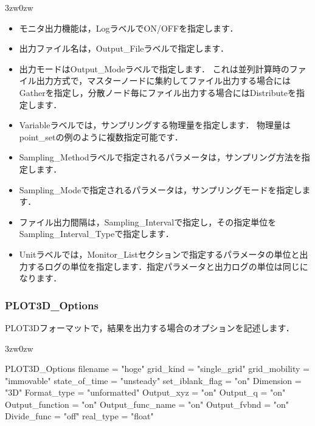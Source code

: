 \begin{indentation}{3zw}{0zw}
\begin{itemize}
\item モニタ出力機能は，LogラベルでON/OFFを指定します．
\item 出力ファイル名は，Output\_Fileラベルで指定します．
\item 出力モードはOutput\_Modeラベルで指定します．
これは並列計算時のファイル出力方式で，マスターノードに集約してファイル出力する場合にはGatherを指定し，分散ノード毎にファイル出力する場合にはDistributeを指定します．
\item Variableラベルでは，サンプリングする物理量を指定します．
物理量はpoint\_setの例のように複数指定可能です．
\item Sampling\_Methodラベルで指定されるパラメータは，サンプリング方法を指定します．
\item Sampling\_Modeで指定されるパラメータは，サンプリングモードを指定します．
\item ファイル出力間隔は，Sampling\_Intervalで指定し，その指定単位をSampling\_Interval\_Typeで指定します．
\item Unitラベルでは，Monitor\_Listセクションで指定するパラメータの単位と出力するログの単位を指定します．指定パラメータと出力ログの単位は同じになります．
\end{itemize}

\end{indentation}


\pagebreak
\subsubsection{PLOT3D\_Options}

PLOT3Dフォーマットで，結果を出力する場合のオプションを記述します．

\begin{indentation}{3zw}{0zw}
\small

\begin{program}
  PLOT3D_Options {
    filename         = "hoge"
    grid_kind        = "single_grid"
    grid_mobility    = "immovable"
    state_of_time    = "unsteady"
    set_iblank_flag  = "on"
    Dimension        = "3D"
    Format_type      = "unformatted"
    Output_xyz       = "on"
    Output_q         = "on"
    Output_function  = "on"
    Output_func_name = "on"
    Output_fvbnd     = "on"
    Divide_func      = "off"
    real_type        = "float"
  }
\end{program}

\end{indentation}



